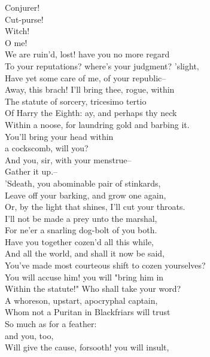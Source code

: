 \documentclass{memoir}
\begin{document}
\begin{drama*}
\facespeaks {} Conjurer!\\
\subtlespeaks {} Cut-purse!\\
\facespeaks  Witch!\\
\dolspeaks {} O me!\\
 We are ruin'd, lost! have you no more regard\\
 To your reputations? where's your judgment? 'slight,\\
 Have yet some care of me, of your republic--\\
\facespeaks  Away, this brach! I'll bring thee, rogue, within\\
 The statute of sorcery, tricesimo tertio\\
 Of Harry the Eighth: ay, and perhaps thy neck\\
 Within a noose, for laundring gold and barbing it.\\
\dolspeaks {} You'll bring your head within\\
 a cockscomb, will you?\\
 And you, sir, with your menstrue--\\
 Gather it up.--\\
 'Sdeath, you abominable pair of stinkards,\\
 Leave off your barking, and grow one again,\\
 Or, by the light that shines, I'll cut your throats.\\
 I'll not be made a prey unto the marshal,\\
 For ne'er a snarling dog-bolt of you both.\\
 Have you together cozen'd all this while,\\
 And all the world, and shall it now be said,\\
 You've made most courteous shift to cozen yourselves?\\
 You will accuse him! you will "bring him in\\
 Within the statute!" Who shall take your word?\\
 A whoreson, upstart, apocryphal captain,\\
 Whom not a Puritan in Blackfriars will trust\\
 So much as for a feather:\\
 and you, too,\\
 Will give the cause, forsooth! you will insult,\\

\end{drama*}
\end{document}
